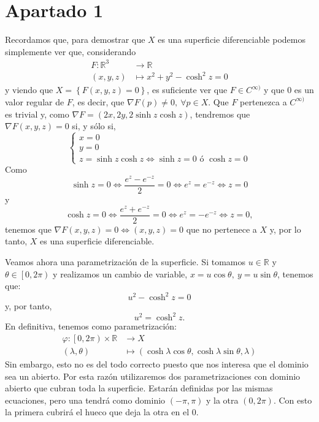 \section{Apartado 1}
Recordamos que, para demostrar que $X$ es una superficie diferenciable podemos
simplemente ver que, considerando
\begin{align*}
    F: \mathbb{R}^3 &\rightarrow \mathbb{R}\\
    \left( x, y, z \right) &\mapsto x^2 + y^2 - \cosh^2z = 0
\end{align*}
y viendo que $X = \left\{ F\left( x, y, z \right) = 0 \right\}$, es suficiente
ver que $F \in C^{\infty)}$ y que $0$ es un valor regular de $F$, es decir, que
$\nabla F\left( p \right) \neq 0,\ \forall p \in X$. Que $F$ pertenezca a
$C^{\infty)}$ es trivial y, como $\nabla F = \left( 2x, 2y, 2\sinh z \cosh z
\right)$, tendremos que $\nabla F\left( x, y, z \right) = 0$ si, y sólo si,
\[
    \begin{cases}
        x = 0\\
        y = 0\\
        z = \sinh z \cosh z \Leftrightarrow \sinh z = 0 \text{ ó } \cosh z = 0
    \end{cases}
\]
Como 
\[
\sinh z = 0 \Leftrightarrow \frac{e^z - e^{-z}}{2} = 0 \Leftrightarrow e^z =
e^{-z} \Leftrightarrow z = 0
\]
y
\[
\cosh z = 0 \Leftrightarrow \frac{e^z + e^{-z}}{2} = 0 \Leftrightarrow e^z =
-e^{-z} \Leftrightarrow z = 0,
\]
tenemos que $\nabla F\left( x, y, z \right) = 0 \Leftrightarrow \left( x, y, z
\right) = 0$ que no pertenece a $X$ y, por lo tanto, $X$ es una superficie
diferenciable.

Veamos ahora una parametrización de la superficie. Si tomamos $u \in \mathbb{R}$
y $\theta \in \left[ 0, 2 \pi \right)$ y realizamos un cambio de variable, $x =
u \cos \theta,\ y = u \sin \theta$, tenemos que:
\[
u^2 - \cosh^2 z = 0
\]
y, por tanto,
\[
u^2 = \cosh^2 z.
\]
En definitiva, tenemos como parametrización: 
\begin{align*}
    \varphi: \left[ 0, 2 \pi \right) \times \mathbb{R} &\rightarrow X\\
    \left( \lambda, \theta \right) &\mapsto \left( \cosh \lambda \cos \theta, \cosh
    \lambda \sin \theta, \lambda \right)
\end{align*}
Sin embargo, esto no es del todo correcto puesto que nos interesa que el dominio
sea un abierto. Por esta razón utilizaremos dos parametrizaciones con dominio
abierto que cubran toda la superficie. Estarán definidas por las mismas
ecuaciones, pero una tendrá como dominio $\left( -\pi, \pi \right)$ y la otra
$\left( 0, 2 \pi \right)$. Con esto la primera cubrirá el hueco que deja la otra
en el $0$.

